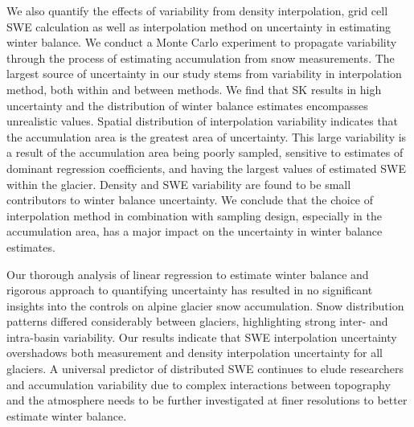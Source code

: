 \documentclass[twocolumn, letterpaper]{igs}
\begin{document}
We also quantify the effects of variability from density interpolation, grid cell SWE calculation as well as interpolation method on uncertainty in estimating winter balance. We conduct a Monte Carlo experiment to propagate variability through the process of estimating accumulation from snow measurements. The largest source of uncertainty in our study stems from variability in interpolation method, both within and between methods. We find that SK results in high uncertainty and the distribution of winter balance estimates encompasses unrealistic values. Spatial distribution of interpolation variability indicates that the accumulation area is the greatest area of uncertainty. This large variability is a result of the accumulation area being poorly sampled, sensitive to estimates of dominant regression coefficients, and having the largest values of estimated SWE within the glacier. Density and SWE variability are found to be small contributors to winter balance uncertainty. We conclude that the choice of interpolation method in combination with sampling design, especially in the accumulation area, has a major impact on the uncertainty in winter balance estimates.

Our thorough analysis of linear regression to estimate winter balance and rigorous approach to quantifying uncertainty has resulted in no significant insights into the controls on alpine glacier snow accumulation. Snow distribution patterns differed considerably between glaciers, highlighting strong inter- and intra-basin variability. Our results indicate that SWE interpolation uncertainty overshadows both measurement and density interpolation uncertainty for all glaciers. A universal predictor of distributed SWE continues to elude researchers and accumulation variability due to complex interactions between topography and the atmosphere needs to be further investigated at finer resolutions to better estimate winter balance. 


%

%


\end{document}
